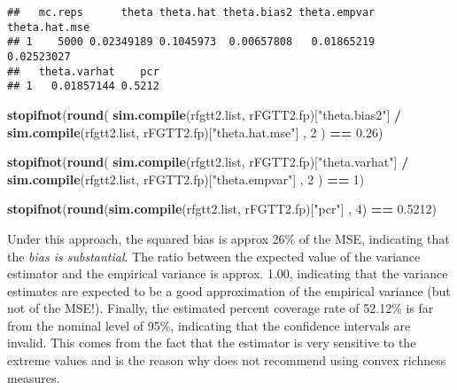 \documentclass[
]{book}
\newenvironment{Shaded}{\begin{snugshade}}{\end{snugshade}}
\newcommand{\DecValTok}[1]{\textcolor[rgb]{0.00,0.00,0.81}{#1}}
\newcommand{\FloatTok}[1]{\textcolor[rgb]{0.00,0.00,0.81}{#1}}
\newcommand{\FunctionTok}[1]{\textcolor[rgb]{0.13,0.29,0.53}{\textbf{#1}}}
\newcommand{\NormalTok}[1]{#1}
\newcommand{\SpecialCharTok}[1]{\textcolor[rgb]{0.81,0.36,0.00}{\textbf{#1}}}
\newcommand{\StringTok}[1]{\textcolor[rgb]{0.31,0.60,0.02}{#1}}
\begin{document}
\begin{verbatim}
##   mc.reps      theta theta.hat theta.bias2 theta.empvar theta.hat.mse
## 1    5000 0.02349189 0.1045973  0.00657808   0.01865219    0.02523027
##   theta.varhat    pcr
## 1   0.01857144 0.5212
\end{verbatim}

\begin{Shaded}
\begin{Highlighting}[]
\FunctionTok{stopifnot}\NormalTok{(}\FunctionTok{round}\NormalTok{(}
  \FunctionTok{sim.compile}\NormalTok{(rfgtt2.list, rFGTT2.fp)[}\StringTok{"theta.bias2"}\NormalTok{] }\SpecialCharTok{/} \FunctionTok{sim.compile}\NormalTok{(rfgtt2.list, rFGTT2.fp)[}\StringTok{"theta.hat.mse"}\NormalTok{] ,}
  \DecValTok{2}
\NormalTok{) }\SpecialCharTok{==} \FloatTok{0.26}\NormalTok{)}

\FunctionTok{stopifnot}\NormalTok{(}\FunctionTok{round}\NormalTok{(}
  \FunctionTok{sim.compile}\NormalTok{(rfgtt2.list, rFGTT2.fp)[}\StringTok{"theta.varhat"}\NormalTok{] }\SpecialCharTok{/} \FunctionTok{sim.compile}\NormalTok{(rfgtt2.list, rFGTT2.fp)[}\StringTok{"theta.empvar"}\NormalTok{] ,}
  \DecValTok{2}
\NormalTok{) }\SpecialCharTok{==} \DecValTok{1}\NormalTok{)}

\FunctionTok{stopifnot}\NormalTok{(}\FunctionTok{round}\NormalTok{(}\FunctionTok{sim.compile}\NormalTok{(rfgtt2.list, rFGTT2.fp)[}\StringTok{"pcr"}\NormalTok{] , }\DecValTok{4}\NormalTok{) }\SpecialCharTok{==} \FloatTok{0.5212}\NormalTok{)}
\end{Highlighting}
\end{Shaded}

Under this approach, the squared bias is approx 26\% of the MSE, indicating that
the \emph{bias is substantial}. The ratio between the expected value of the variance
estimator and the empirical variance is approx. 1.00, indicating that the variance
estimates are expected to be a good approximation of the empirical variance (but
not of the MSE!). Finally, the estimated percent coverage rate of 52.12\% is far
from the nominal level of 95\%, indicating that the confidence intervals are invalid.
This comes from the fact that the estimator is very sensitive to the extreme values
and is the reason why \textcite{brz2014} does not recommend using convex richness measures.

\printbibliography
\end{document}

